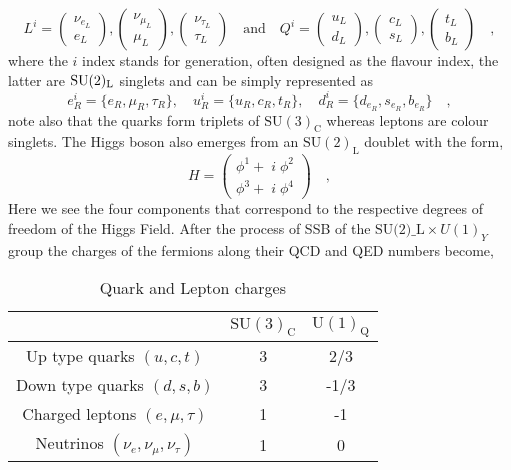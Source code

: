 \begin{equation}
L^i= \begin{pmatrix}
\nu_{e_L} \\ e_L 
\end{pmatrix},
\begin{pmatrix}
\nu_{\mu_L} \\ \mu_L 
\end{pmatrix},
\begin{pmatrix}
\nu_{\tau_L} \\ \tau_L 
\end{pmatrix} 
\quad 
\text{and} \quad Q^i= \begin{pmatrix}
u_{L} \\
d_L 
\end{pmatrix},\begin{pmatrix}
c_{L} \\
s_L 
\end{pmatrix}
,\begin{pmatrix}
t_{L} \\
b_L 
\end{pmatrix} \quad ,
\end{equation}
where the $i$ index stands for generation, often designed as the flavour index, the latter are $\mathrm{SU}(2)_{\mathrm{L}}$ singlets and can be simply represented as
%
 \begin{equation}
e^i_R=\{e_R,\mu_R,\tau_R\}, \quad  u^i_R=\{u_R,c_R,t_R\}, \quad d^i_R=\{d_{e_R},s_{e_R},b_{e_R}\} \quad , 
\end{equation}
%
note also that the quarks form triplets of $\mathrm{SU(3)_C}$ whereas leptons are colour singlets. The Higgs boson also emerges from an $\mathrm{SU(2)_L}$ doublet with the form,
%
\begin{equation}
H=\begin{pmatrix}
\phi^1 + \; i \; \phi^2 \\
\phi^3 + \; i \; \phi^4  
\end{pmatrix} \quad , 
\end{equation}
%
%
%
Here we see the four components that correspond to the respective degrees of freedom of the Higgs Field. 
% 
After the process of SSB of the $\textrm{SU(2)_L} \times U(1)_Y$ group the charges of the fermions along their QCD and QED numbers become, 

\begin{table}[H]
\caption{Quark and Lepton charges}
\centering
\begin{tabular}{ccc}
  \hline & $\mathrm{SU(3)_C}$ & $\mathrm{U(1)_Q}$ \\
  \hline 
Up type quarks $(u,c,t)$ & 3 & 2/3 \\
Down type quarks $(d,s,b)$ & 3 & -1/3 \\
Charged leptons $(e,\mu,\tau)$ & 1 & -1 \\
Neutrinos  $(\nu_e,\nu_\mu,\nu_\tau)$  & 1 & 0 \\
  \hline	
\end{tabular}
\end{table}


